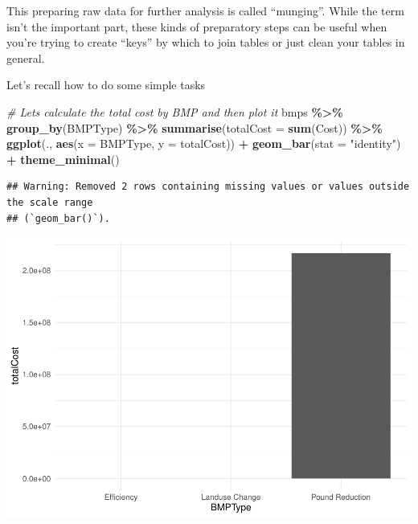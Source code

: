\documentclass[]{article}
\newenvironment{Shaded}{\begin{snugshade}}{\end{snugshade}}
\newcommand{\AttributeTok}[1]{\textcolor[rgb]{0.13,0.29,0.53}{#1}}
\newcommand{\CommentTok}[1]{\textcolor[rgb]{0.56,0.35,0.01}{\textit{#1}}}
\newcommand{\FunctionTok}[1]{\textcolor[rgb]{0.13,0.29,0.53}{\textbf{#1}}}
\newcommand{\NormalTok}[1]{#1}
\newcommand{\SpecialCharTok}[1]{\textcolor[rgb]{0.81,0.36,0.00}{\textbf{#1}}}
\newcommand{\StringTok}[1]{\textcolor[rgb]{0.31,0.60,0.02}{#1}}
\begin{document}
This preparing raw data for further analysis is called ``munging''.
While the term isn't the important part, these kinds of preparatory
steps can be useful when you're trying to create ``keys'' by which to
join tables or just clean your tables in general.

Let's recall how to do some simple tasks

\begin{Shaded}
\begin{Highlighting}[]
\CommentTok{\# Let\textquotesingle{}s calculate the total cost by BMP and then plot it}
\NormalTok{bmps }\SpecialCharTok{\%\textgreater{}\%} \FunctionTok{group\_by}\NormalTok{(BMPType) }\SpecialCharTok{\%\textgreater{}\%} \FunctionTok{summarise}\NormalTok{(}\AttributeTok{totalCost =} \FunctionTok{sum}\NormalTok{(Cost)) }\SpecialCharTok{\%\textgreater{}\%}
  \FunctionTok{ggplot}\NormalTok{(., }\FunctionTok{aes}\NormalTok{(}\AttributeTok{x =}\NormalTok{ BMPType, }\AttributeTok{y =}\NormalTok{ totalCost)) }\SpecialCharTok{+}
  \FunctionTok{geom\_bar}\NormalTok{(}\AttributeTok{stat =} \StringTok{"identity"}\NormalTok{) }\SpecialCharTok{+}
  \FunctionTok{theme\_minimal}\NormalTok{()}
\end{Highlighting}
\end{Shaded}

\begin{verbatim}
## Warning: Removed 2 rows containing missing values or values outside the scale range
## (`geom_bar()`).
\end{verbatim}

\includegraphics{lab02_files/figure-latex/review-1.pdf}

\begin{Shaded}
\end{Shaded}
\end{document}
